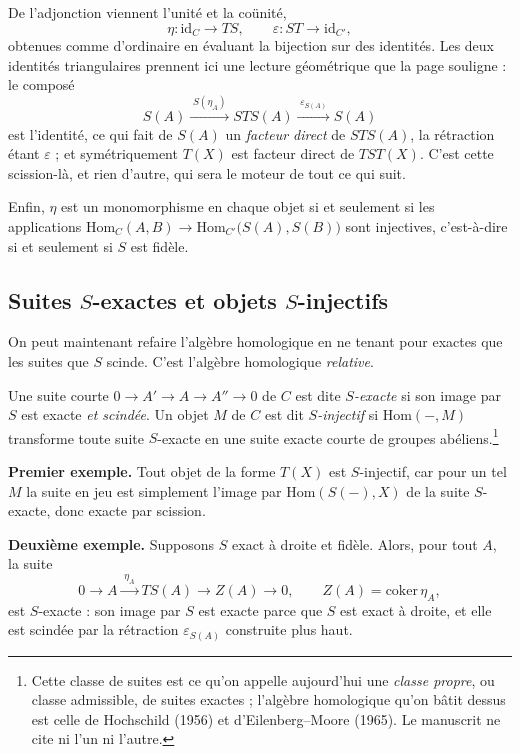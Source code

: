 \documentclass[11pt,a4paper]{article}
\begin{document}
De l'adjonction viennent l'unité et la coünité,
\[
  \eta : \mathrm{id}_{C} \longrightarrow TS , \qquad
  \varepsilon : ST \longrightarrow \mathrm{id}_{C'} ,
\]
obtenues comme d'ordinaire en évaluant la bijection sur des identités. Les deux
identités triangulaires prennent ici une lecture géométrique que la page
souligne : le composé
\[
  S(A) \xrightarrow{\;S(\eta_{A})\;} STS(A)
  \xrightarrow{\;\varepsilon_{S(A)}\;} S(A)
\]
est l'identité, ce qui fait de $S(A)$ un \emph{facteur direct} de $STS(A)$, la
rétraction étant $\varepsilon$ ; et symétriquement $T(X)$ est facteur direct de
$TST(X)$. C'est cette scission-là, et rien d'autre, qui sera le moteur de tout
ce qui suit.

Enfin, $\eta$ est un monomorphisme en chaque objet si et seulement si les
applications $\mathrm{Hom}_{C}(A,B) \to \mathrm{Hom}_{C'}\bigl( S(A), S(B)
\bigr)$ sont injectives, c'est-à-dire si et seulement si $S$ est fidèle.

\subsection*{Suites $S$-exactes et objets $S$-injectifs}

On peut maintenant refaire l'algèbre homologique en ne tenant pour exactes que
les suites que $S$ scinde. C'est l'algèbre homologique \emph{relative}.

Une suite courte $0 \to A' \to A \to A'' \to 0$ de $C$ est dite
\emph{$S$-exacte} si son image par $S$ est exacte \emph{et scindée}. Un objet
$M$ de $C$ est dit \emph{$S$-injectif} si $\mathrm{Hom}(-, M)$ transforme toute
suite $S$-exacte en une suite exacte courte de groupes abéliens.\footnote{Cette
classe de suites est ce qu'on appelle aujourd'hui une \emph{classe propre}, ou
classe admissible, de suites exactes ; l'algèbre homologique qu'on bâtit dessus
est celle de Hochschild (1956) et d'Eilenberg--Moore (1965). Le manuscrit ne
cite ni l'un ni l'autre.}

\textbf{Premier exemple.} Tout objet de la forme $T(X)$ est $S$-injectif, car
pour un tel $M$ la suite en jeu est simplement l'image par $\mathrm{Hom}(S(-),
X)$ de la suite $S$-exacte, donc exacte par scission.

\textbf{Deuxième exemple.} Supposons $S$ exact à droite et fidèle. Alors, pour
tout $A$, la suite
\[
  0 \longrightarrow A \xrightarrow{\;\eta_{A}\;} TS(A) \longrightarrow Z(A)
  \longrightarrow 0 , \qquad Z(A) = \mathrm{coker}\,\eta_{A} ,
\]
est $S$-exacte : son image par $S$ est exacte parce que $S$ est exact à droite,
et elle est scindée par la rétraction $\varepsilon_{S(A)}$ construite plus
haut.
\end{document}
